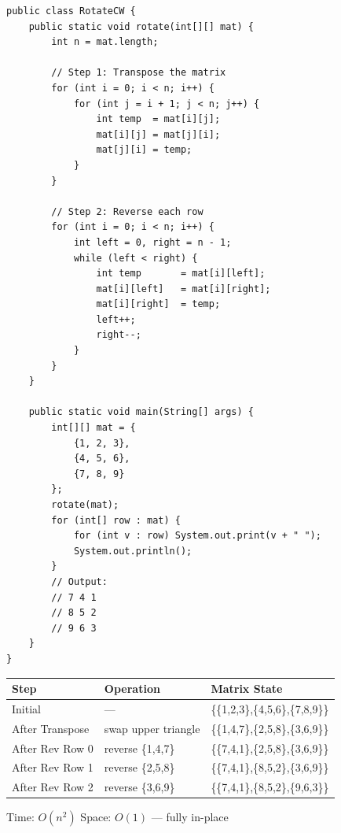 \documentclass[12pt,a4paper,oneside]{book}
\begin{document}
\begin{lstlisting}[caption={Rotate Matrix 90° Clockwise --- Transpose + Reverse Rows}]
public class RotateCW {
    public static void rotate(int[][] mat) {
        int n = mat.length;

        // Step 1: Transpose the matrix
        for (int i = 0; i < n; i++) {
            for (int j = i + 1; j < n; j++) {
                int temp  = mat[i][j];
                mat[i][j] = mat[j][i];
                mat[j][i] = temp;
            }
        }

        // Step 2: Reverse each row
        for (int i = 0; i < n; i++) {
            int left = 0, right = n - 1;
            while (left < right) {
                int temp       = mat[i][left];
                mat[i][left]   = mat[i][right];
                mat[i][right]  = temp;
                left++;
                right--;
            }
        }
    }

    public static void main(String[] args) {
        int[][] mat = {
            {1, 2, 3},
            {4, 5, 6},
            {7, 8, 9}
        };
        rotate(mat);
        for (int[] row : mat) {
            for (int v : row) System.out.print(v + " ");
            System.out.println();
        }
        // Output:
        // 7 4 1
        // 8 5 2
        // 9 6 3
    }
}
\end{lstlisting}

\begin{dryrun}
\begin{center}
\begin{tabular}{lll}
\toprule
\textbf{Step} & \textbf{Operation} & \textbf{Matrix State}\\
\midrule
Initial        & ---                 & \{\{1,2,3\},\{4,5,6\},\{7,8,9\}\}\\
After Transpose& swap upper triangle & \{\{1,4,7\},\{2,5,8\},\{3,6,9\}\}\\
After Rev Row 0& reverse \{1,4,7\}   & \{\{7,4,1\},\{2,5,8\},\{3,6,9\}\}\\
After Rev Row 1& reverse \{2,5,8\}   & \{\{7,4,1\},\{8,5,2\},\{3,6,9\}\}\\
After Rev Row 2& reverse \{3,6,9\}   & \{\{7,4,1\},\{8,5,2\},\{9,6,3\}\}\\
\bottomrule
\end{tabular}
\end{center}
\end{dryrun}

\begin{complexity}
Time: $O(n^2)$ \quad Space: $O(1)$ --- fully in-place
\end{complexity}
\end{document}
